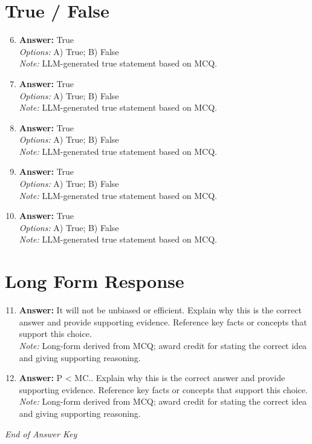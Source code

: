 \documentclass[12pt]{article}
\begin{document}
\section*{True / False}
\begin{enumerate}[label=\arabic*.]
\setcounter{enumi}{5}
\item \textbf{Answer:} True
\\ \textit{Options:} A) True; B) False
\\ \textit{Note:} LLM-generated true statement based on MCQ.
\item \textbf{Answer:} True
\\ \textit{Options:} A) True; B) False
\\ \textit{Note:} LLM-generated true statement based on MCQ.
\item \textbf{Answer:} True
\\ \textit{Options:} A) True; B) False
\\ \textit{Note:} LLM-generated true statement based on MCQ.
\item \textbf{Answer:} True
\\ \textit{Options:} A) True; B) False
\\ \textit{Note:} LLM-generated true statement based on MCQ.
\item \textbf{Answer:} True
\\ \textit{Options:} A) True; B) False
\\ \textit{Note:} LLM-generated true statement based on MCQ.
\end{enumerate}

\section*{Long Form Response}
\begin{enumerate}[label=\arabic*.]
\setcounter{enumi}{10}
\item \textbf{Answer:} It will not be unbiased or efficient. Explain why this is the correct answer and provide supporting evidence. Reference key facts or concepts that support this choice.
\\ \textit{Note:} Long-form derived from MCQ; award credit for stating the correct idea and giving supporting reasoning.
\item \textbf{Answer:} P \textless{} MC.. Explain why this is the correct answer and provide supporting evidence. Reference key facts or concepts that support this choice.
\\ \textit{Note:} Long-form derived from MCQ; award credit for stating the correct idea and giving supporting reasoning.
\end{enumerate}

\vfill
\noindent\textit{End of Answer Key}
\end{document}
